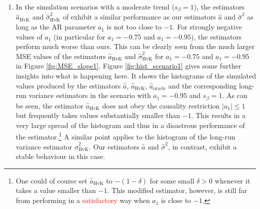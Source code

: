 \begin{enumerate}[label=(\alph*),leftmargin=0.7cm]


\item In the simulation scenarios with a moderate trend ($s_\beta = 1$), the estimators $\widehat{a}_{\text{HvK}}$ and $\widehat{\sigma}^2_{\text{HvK}}$ of \cite{Hall2003} exhibit a similar performance as our estimators $\widehat{a}$ and $\widehat{\sigma}^2$ as long as the AR parameter $a_1$ is not too close to $-1$. For strongly negative values of $a_1$ (in particular for $a_1 = -0.75$ and $a_1 = -0.95$), the estimators perform much worse than ours. This can be clearly seen from the much larger MSE values of the estimators  $\widehat{a}_{\text{HvK}}$ and $\widehat{\sigma}^2_{\text{HvK}}$ for $a_1 = -0.75$ and $a_1 = -0.95$ in Figure \ref{fig:MSE_slope1}. Figure \ref{fig:hist_scenario1} gives some further insights into what is happening here. It shows the histograms of the simulated values produced by the estimators $\widehat{a}$, $\widehat{a}_{\text{HvK}}$, $\widehat{a}_{\text{oracle}}$ and the corresponding long-run variance estimators in the scenario with $a_1=-0.95$ and $s_\beta = 1$. As can be seen, the estimator $\widehat{a}_{\text{HvK}}$ does not obey the causality restriction $|a_1| \le 1$ but frequently takes values substantially smaller than $-1$. This results in a very large spread of the histogram and thus in a disastrous performance of the estimator.\footnote{One could of course set $\widehat{a}_{\text{HvK}}$ to $-(1 - \delta)$ for some small $\delta > 0$ whenever it takes a value smaller than $-1$. This modified estimator, however, is still far from performing in a \textcolor{red}{satisfactory} way when $a_1$ is close to $-1$.} A similar point applies to the histogram of the long-run variance estimator $\widehat{\sigma}^2_{\text{HvK}}$. Our estimators $\widehat{a}$ and $\widehat{\sigma}^2$, in contrast, exhibit a stable behaviour in this case. \\ %

\end{enumerate}
